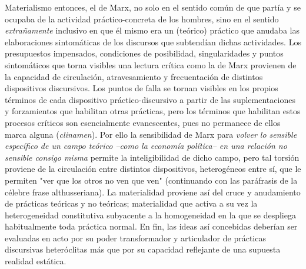 Materialismo entonces, el de Marx, no solo en el sentido común de que
partía y se ocupaba de la actividad práctico-concreta de los hombres,
sino en el sentido \emph{extrañamente} inclusivo en que él mismo era un
(teórico) práctico que anudaba las elaboraciones sintomáticas de los
discursos que subtendían dichas actividades. Los presupuestos
impensados, condiciones de posibilidad, singularidades y puntos
sintomáticos que torna visibles una lectura crítica como la de Marx
provienen de la capacidad de circulación, atravesamiento y frecuentación
de distintos dispositivos discursivos. Los puntos de falla se tornan
visibles en los propios términos de cada dispositivo práctico-discursivo
a partir de las suplementaciones y forzamientos que habilitan otras
prácticas, pero los términos que habilitan estos procesos críticos son
esencialmente evanescentes, pues no permanece de ellos marca alguna
(\emph{clinamen}). Por ello la sensibilidad de Marx para \emph{volver lo
sensible específico de un campo teórico --como la economía política-- en
una relación no sensible consigo misma} permite la inteligibilidad de
dicho campo, pero tal torsión proviene de la circulación entre distintos
dispositivos, heterogéneos entre sí, que le permiten "ver que los otros
no ven que ven" (continuando con las paráfrasis de la célebre frase
althusseriana). La materialidad proviene así del cruce y anudamiento de
prácticas teóricas y no teóricas; materialidad que activa a su vez la
heterogeneidad constitutiva subyacente a la homogeneidad en la que se
despliega habitualmente toda práctica normal. En fin, las ideas así
concebidas deberían ser evaluadas en acto por su poder transformador y
articulador de prácticas discursivas heteróclitas más que por su
capacidad reflejante de una supuesta realidad estática.

